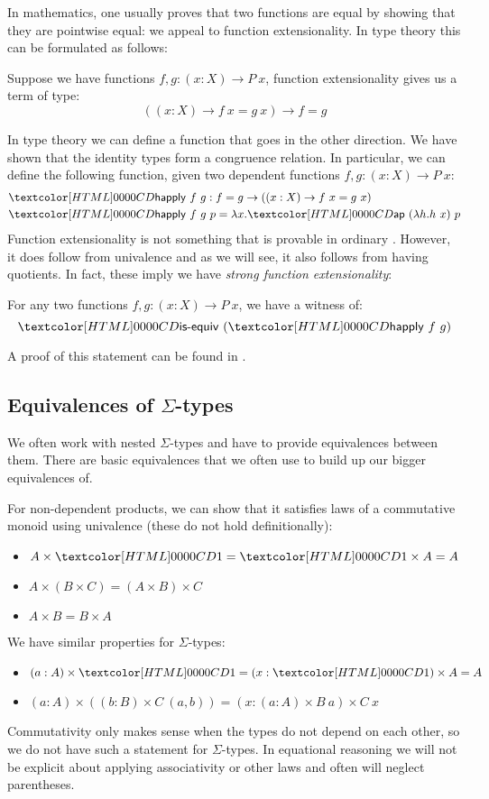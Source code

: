 In mathematics, one usually proves that two functions are equal by
showing that they are pointwise equal: we appeal to function
extensionality. In type theory this can be formulated as follows:
%
\begin{definition}
  Suppose we have functions $f, g : (x : X) \to P\ x$, function
  extensionality gives us a term of type:
  $$
  ((x : X) \to f\ x = g\ x) \to f = g
  $$
\end{definition}
%
In type theory we can define a function that goes in the other
direction. We have shown that the identity types form a congruence
relation. In particular, we can define the following function, given
two dependent functions $f, g : (x : X) \to P\ x$:
%
\begin{align*}
  &\happly\ f\ g : f = g \to ((x : X) \to f\ x = g\ x) \\
  &\happly\ f\ g\ p = \lambda x . \ap\ (\lambda h . h\ x)\ p
\end{align*}
%
Function extensionality is not something that is provable in ordinary
\mltt. However, it does follow from univalence and as we will see, it
also follows from having quotients. In fact, these imply we have
\emph{strong function extensionality}:

\begin{proposition}
  For any two functions $f, g : (x : X) \to P\ x$, we have a witness of:
  $$
  \isequiv\ (\happly\ f\ g)
  $$
\end{proposition}
%
A proof of this statement can be found in \cite{UFP2013}.

\subsection{Equivalences of $\Sigma$-types}

We often work with nested $\Sigma$-types and have to provide
equivalences between them. There are basic equivalences that we often
use to build up our bigger equivalences of.

For non-dependent products, we can show that it satisfies laws of a
commutative monoid using univalence (these do not hold
definitionally):
\begin{itemize}
\item $A \times \unitty = \unitty \times A = A$
\item $A \times (B \times C) = (A \times B) \times C$
\item $A \times B = B \times A$
\end{itemize}
We have similar properties for $\Sigma$-types:
\begin{itemize}
\item $(a : A) \times \unitty = (x : \unitty) \times A = A$
\item $(a : A) \times ((b : B) \times C\ (a , b)) = (x : (a : A) \times B\ a) \times C\ x$
\end{itemize}
Commutativity only makes sense when the types do not depend on
each other, so we do not have such a statement for $\Sigma$-types. In
equational reasoning we will not be explicit about applying
associativity or other laws and often will neglect parentheses.

